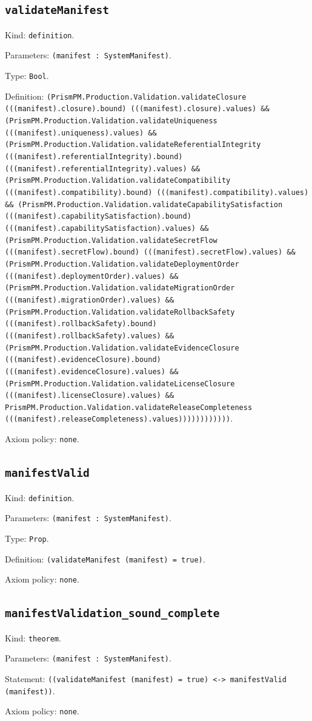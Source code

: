\documentclass[11pt]{article}
\begin{document}
\subsection*{\texttt{validateManifest}}
\noindent Kind: \texttt{definition}.\par
\noindent Parameters: \texttt{(manifest : SystemManifest)}.\par
\noindent Type: \texttt{Bool}.\par
\noindent Definition: \texttt{(PrismPM.Production.Validation.validateClosure (((manifest).closure).bound) (((manifest).closure).values) \&\& (PrismPM.Production.Validation.validateUniqueness (((manifest).uniqueness).values) \&\& (PrismPM.Production.Validation.validateReferentialIntegrity (((manifest).referentialIntegrity).bound) (((manifest).referentialIntegrity).values) \&\& (PrismPM.Production.Validation.validateCompatibility (((manifest).compatibility).bound) (((manifest).compatibility).values) \&\& (PrismPM.Production.Validation.validateCapabilitySatisfaction (((manifest).capabilitySatisfaction).bound) (((manifest).capabilitySatisfaction).values) \&\& (PrismPM.Production.Validation.validateSecretFlow (((manifest).secretFlow).bound) (((manifest).secretFlow).values) \&\& (PrismPM.Production.Validation.validateDeploymentOrder (((manifest).deploymentOrder).values) \&\& (PrismPM.Production.Validation.validateMigrationOrder (((manifest).migrationOrder).values) \&\& (PrismPM.Production.Validation.validateRollbackSafety (((manifest).rollbackSafety).bound) (((manifest).rollbackSafety).values) \&\& (PrismPM.Production.Validation.validateEvidenceClosure (((manifest).evidenceClosure).bound) (((manifest).evidenceClosure).values) \&\& (PrismPM.Production.Validation.validateLicenseClosure (((manifest).licenseClosure).values) \&\& PrismPM.Production.Validation.validateReleaseCompleteness (((manifest).releaseCompleteness).values))))))))))))}.\par
\noindent Axiom policy: \texttt{none}.\par
\subsection*{\texttt{manifestValid}}
\noindent Kind: \texttt{definition}.\par
\noindent Parameters: \texttt{(manifest : SystemManifest)}.\par
\noindent Type: \texttt{Prop}.\par
\noindent Definition: \texttt{(validateManifest (manifest) = true)}.\par
\noindent Axiom policy: \texttt{none}.\par
\subsection*{\texttt{manifestValidation\_sound\_complete}}
\noindent Kind: \texttt{theorem}.\par
\noindent Parameters: \texttt{(manifest : SystemManifest)}.\par
\noindent Statement: \texttt{((validateManifest (manifest) = true) <-> manifestValid (manifest))}.\par
\noindent Axiom policy: \texttt{none}.\par
\end{document}
